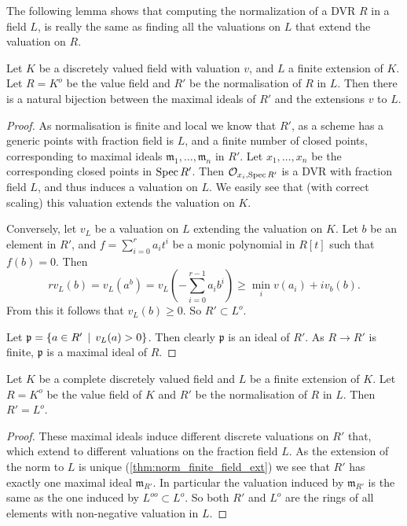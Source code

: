 The following lemma shows that computing the normalization of a DVR $R$ in a field $L$, is really the same as finding all the valuations on $L$ that extend the valuation on $R$. 
\begin{lemma}\label{lem:normalisation_extension_norm}
	Let $K$ be a discretely valued field with valuation $v$, and $L$ a finite extension of $K$. 
	Let $R = K^{o}$ be the value field and $R'$ be the normalisation of $R$ in $L$. 
	Then there is a natural bijection between the maximal ideals of $R'$ and the extensions $v $ to $L$. 
\end{lemma}
\begin{proof}
	As normalisation is finite and local we know that $R'$, as a scheme has a generic points with fraction field is $L$, and a finite number of closed points, corresponding to maximal ideals $\mathfrak{m}_1, \ldots, \mathfrak{m} _n $ in $R'$. 
	Let $x_1, \ldots, x_n$ be the corresponding closed points in $\operatorname{Spec} R'$. 
	Then $\mathcal{O}_{x_i, \operatorname{Spec} R'}$ is a DVR with fraction field $L$, and thus induces a valuation on $L$. 
	We easily see that (with correct scaling) this valuation extends the valuation on $K$. 

	Conversely, let $v_L$ be a valuation on $L$ extending the valuation on $K$. 
	Let $b$ be an element in $R'$, and $f = \sum_{i = 0}^{r} a_i t^{i}$ be a monic polynomial in $R[t]$ such that $f(b) = 0$. 
	Then \[
		rv_L(b) = v_L(a^{b}) = v_L \left(-\sum_{i = 0}^{r-1} a_i b^{i}\right) \ge \min_{i} v(a_i) + iv_b(b)
	.\] 
	From this it follows that $v_L(b) \ge 0$. 
	So $R' \subset L^{o}$.  

	Let $\mathfrak{p}  = \{a \in R' \st v_L(a) > 0\} $. 
	Then clearly $\mathfrak{p} $ is an ideal of $R'$. 
	As $R \to R'$ is finite, $\mathfrak{p} $ is a maximal ideal of $R$. 
\end{proof}

\begin{lemma}
	Let $K$ be a complete discretely valued field and $L$ be a finite extension of $K$.	Let $R = K^{o}$  be the value field of $K$ and $R'$ be the normalisation of $R$ in $L$. 
	Then $R' = L^{o}$. 
\end{lemma}
\begin{proof}
	These maximal ideals induce different discrete valuations on $R'$ that, which extend to different valuations on the fraction field $L$. 
	As the extension of the norm to $L$ is unique (\cref{thm:norm_finite_field_ext}) we see that $R'$ has exactly one maximal ideal $\mathfrak{m}_{R'}$. 
	In particular the valuation induced by $\mathfrak{m}_{R'} $ is the same as the one induced by $L^{oo} \subset L^{o}$. 
	So both $R'$ and $L^{o}$ are the rings of all elements with non-negative valuation in $L$. 
\end{proof}

